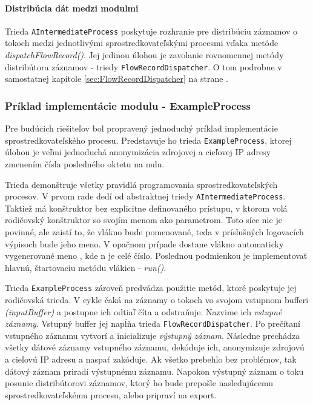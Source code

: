 \paragraph{Distribúcia dát medzi modulmi} 
Trieda \verb|AIntermediateProcess| poskytuje rozhranie pre distribúciu záznamov o tokoch medzi 
jednotlivými sprostredkovateľskými procesmi vďaka metóde \emph{dispatchFlowRecord()}. 
Jej jedinou úlohou je zavolanie rovnomennej metódy distribútora záznamov - triedy \verb|FlowRecordDispatcher|.
O tom podrobne v samostatnej kapitole \ref{sec:FlowRecordDispatcher} na strane 
\pageref{sec:FlowRecordDispatcher}.



\subsubsection{Príklad implementácie modulu - ExampleProcess}

Pre budúcich riešiteľov bol propravený jednoduchý príklad implementácie sprostredkovateľského procesu.
Predstavuje ho trieda \verb|ExampleProcess|, ktorej úlohou je veľmi jednoduchá anonymizácia zdrojovej a 
cieľovej IP adresy zmenením čísla posledného oktetu na nulu. 

Trieda demonštruje všetky pravidlá programovania sprostredkovateľských procesov. V prvom rade dedí od 
abstraktnej triedy \verb|AIntermediateProcess|. Taktiež má konštruktor bez explicitne definovaného 
prístupu, v ktorom volá rodičovský konštruktor so svojím menom ako parametrom. Toto síce nie je povinné,
ale zaistí to, že vlákno bude pomenované, teda v príslušných logovacích výpisoch bude jeho meno.
V opačnom prípade dostane vlákno automaticky vygenerované meno , kde n je celé číslo.
Poslednou podmienkou je implementovať hlavnú, štartovaciu metódu vlákien - \emph{run()}.

Trieda \verb|ExampleProcess| zároveň predvádza použitie metód, ktoré poskytuje jej rodičovská trieda.
V cykle čaká na záznamy o tokoch vo svojom vstupnom bufferi \emph{(inputBuffer)} a postupne ich odtiaľ 
číta a odstraňuje. Nazvime ich 
\emph{vstupné záznamy}. Vstupný buffer jej napĺňa trieda \verb|FlowRecordDispatcher|. Po prečítaní 
vstupného záznamu vytvorí a inicializuje \emph{výstupný záznam}. Následne prechádza všetky dátové záznamy
vstupného záznamu, dekóduje ich, anonymizuje zdrojovú a cieľovú IP adresu a naspať zakóduje. Ak všetko 
prebehlo bez problémov, tak dátový záznam priradí výstupnému záznamu. Napokon výstupný záznam o toku 
posunie distribútorovi záznamov, ktorý ho bude prepošle 
nasledujúcemu sprostredkovateľskému procesu, alebo pripraví na export.




